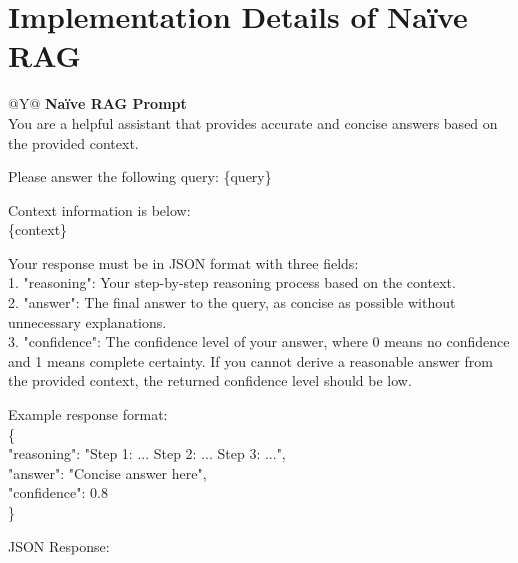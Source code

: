 \documentclass{article}
\theoremstyle{plain}
\theoremstyle{definition}
\theoremstyle{remark}
\begin{document}
\section{Implementation Details of Naïve RAG} \label{GG}

\begin{table}[htb]
  \centering
  \caption{Naïve RAG Prompt}
  \label{tab:naive_rag}
  \begin{tabularx}{\textwidth}{@{}Y@{}}
    \toprule
    \textbf{Naïve RAG Prompt} \\     %
    \midrule
    You are a helpful assistant that provides accurate and concise answers based on the provided context.\\

    \par\medskip
    Please answer the following query: \{query\}\\

    \par\medskip
    Context information is below:\\
    \{context\}

    \par\medskip
    Your response must be in JSON format with three fields:\\
    1. "reasoning": Your step-by-step reasoning process based on the context.\\
    2. "answer": The final answer to the query, as concise as possible without unnecessary explanations.\\
    3. "confidence": The confidence level of your answer, where 0 means no confidence and 1 means complete certainty. If you cannot derive a reasonable answer from the provided context, the returned confidence level should be low.\\

    \par\medskip
    Example response format:\\
    \{\\
        "reasoning": "Step 1: ... Step 2: ... Step 3: ...",\\
        "answer": "Concise answer here",\\
        "confidence": 0.8\\
    \}\\

    \par\medskip
    JSON Response:\\

    \bottomrule
  \end{tabularx}
\end{table}
\end{document}
